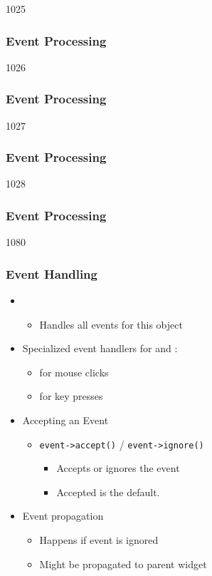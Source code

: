 \begin{slide}{1025}\frametitle{Event Processing}
\end{slide}

\begin{slide}{1026}\frametitle{Event Processing}
\end{slide}

\begin{slide}{1027}\frametitle{Event Processing}
\end{slide}

\begin{slide}{1028}\frametitle{Event Processing}

\end{slide}

\begin{slide}{1080}
\frametitle{Event Handling}

\begin{itemize}
\item {}
  \begin{itemize}
  \item Handles all events for this object
 \end{itemize}
\item Specialized event handlers for  and :
  \begin{itemize}
  \item {} for mouse clicks
  \item {} for key presses
 \end{itemize}\bigskip
\item Accepting an Event
  \begin{itemize}
  \item \lstinline{event->accept()} / \lstinline{event->ignore()}
    \begin{itemize}
    \item Accepts or ignores the event
    \item Accepted is the default.
    \end{itemize}
  \end{itemize}
\item Event propagation
  \begin{itemize}
  \item Happens if event is ignored
  \item Might be propagated to parent widget
  \end{itemize}
\end{itemize}
\end{slide}

